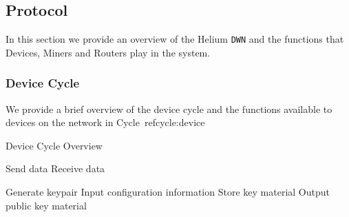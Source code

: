 \documentclass[letterpaper,11pt]{article}
\begin{document}
\subsection{Protocol}

In this section we provide an overview of the Helium \verb|DWN| and the functions that Devices, Miners and Routers play in the system.


\subsubsection{Device Cycle}

We provide a brief overview of the device cycle and the functions available to devices on the network in Cycle~ref{cycle:device}

\begin{algorithm}[!htb]
  \DontPrintSemicolon
  \caption{Device Cycle Overview}\label{cycle:device}

   {
    Send data \;
    Receive data \;
  }

   {
    Generate keypair \;
    Input configuration information \;
    Store key material \;
    Output public key material \;
  }
\end{algorithm}
\FloatBarrier
\end{document}
